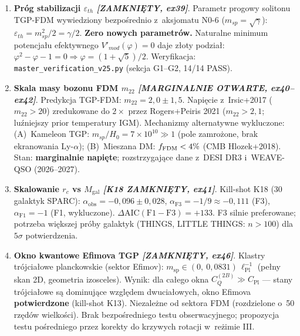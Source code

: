 \begin{enumerate}[label=\textbf{O\arabic*}., start=21, nosep]
  \item \textbf{Próg stabilizacji $\varepsilon_{th}$
        \emph{[ZAMKNI\k{E}TY, ex39]}}.
        Parametr progowy solitonu TGP-FDM wywiedziony
        bezpo\'srednio z~aksjomatu N0-6 ($m_{sp}=\sqrt{\gamma}$):
        $\varepsilon_{th} = m_{sp}^2/2 = \gamma/2$.
        \textbf{Zero nowych parametr\'ow.}
        Naturalne minimum potencja\l{}u efektywnego
        $V'_{mod}(\varphi) = 0$ daje z\l{}oty podzia\l{}:
        $\varphi^2 - \varphi - 1 = 0 \Rightarrow \varphi = (1+\sqrt{5})/2$.
        Weryfikacja: \texttt{master\_verification\_v25.py}
        (sekcja G1--G2, 14/14 PASS).

  \item \textbf{Skala masy bozonu FDM $m_{22}$
        \emph{[MARGINALNIE OTWARTE, ex40--ex42]}}.
        Predykcja TGP-FDM: $m_{22} = 2{,}0 \pm 1{,}5$.
        Napi\k{e}cie z~Irsic+2017 ($m_{22} > 20$) zredukowane do $2\times$
        przez Rogers+Peiris 2021 ($m_{22} > 2{,}1$;
        lu\'zniejszy prior temperatury IGM).
        Mechanizmy alternatywne wykluczone:
        (A)~Kameleon TGP: $m_{sp}/H_0 = 7\times10^{10} \gg 1$
        (pole zamro\.zone, brak ekranowania Ly-$\alpha$);
        (B)~Mieszana DM: $f_{\rm FDM} < 4\%$ (CMB Hlozek+2018).
        Stan: \textbf{marginalnie napięte}; rozstrzygaj\k{a}ce
        dane z~DESI DR3 i~WEAVE-QSO (2026--2027).

  \item \textbf{Skalowanie $r_c$ vs $M_{\mathrm{gal}}$ \emph{[K18 ZAMKNI\k{E}TY, ex41]}}.
        Kill-shot K18 (30 galaktyk SPARC):
        $\alpha_{\mathrm{obs}} = -0{,}096 \pm 0{,}028$,
        $\alpha_{\mathrm{F3}} = -1/9 \approx -0{,}111$ (F3),
        $\alpha_{\mathrm{F1}} = -1$ (F1, wykluczone).
        $\Delta\mathrm{AIC}(\mathrm{F1-F3}) = +133$.
        F3 silnie preferowane; potrzeba wi\k{e}kszej pr\'oby galaktyk
        (THINGS, LITTLE THINGS: $n > 100$) dla $5\sigma$ potwierdzenia.

  \item \textbf{Okno kwantowe Efimova TGP \emph{[ZAMKNI\k{E}TY, ex46]}}.
        Klastry tr\'ojcia\l{}owe planckowskie (sektor Efimov):
        $m_{\mathrm{sp}} \in (0,\ 0{,}0831)\,\ell_{\mathrm{Pl}}^{-1}$
        (pe\l{}ny skan 2D, geometria izosceles).
        Wynik: dla ca\l{}ego okna $C_Q^{(2B)} \gg C_{\mathrm{Pl}}$
        --- stany trójcia\l{}owe s\k{a} dominuj\k{a}ce wzgl\k{e}dem
        dwucia\l{}owych, okno Efimova \textbf{potwierdzone} (kill-shot K13).
        Niezale\.zne od sektora FDM (rozdzielone o~50 rz\k{e}d\'ow wielkości).
        Brak bezpo\'sredniego testu obserwacyjnego; propozycja testu
        po\'sredniego przez korekty do krzywych rotacji w~re\.zimie III.
\end{enumerate}

